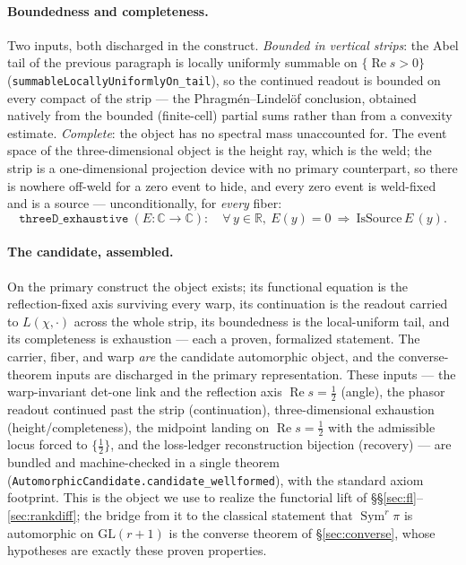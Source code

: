 \documentclass[11pt]{article}
\theoremstyle{definition}
\renewcommand{\Re}{\operatorname{Re}}
\newcommand{\Sym}{\operatorname{Sym}}
\begin{document}
\paragraph{Boundedness and completeness.} Two inputs, both discharged in the construct.
\emph{Bounded in vertical strips}: the Abel tail of the previous paragraph is locally uniformly
summable on $\{\Re s>0\}$ (\texttt{summableLocallyUniformlyOn\_tail}), so the continued readout is
bounded on every compact of the strip --- the Phragm\'en--Lindel\"of conclusion, obtained natively from
the bounded (finite-cell) partial sums rather than from a convexity estimate.
\emph{Complete}: the object has no spectral mass unaccounted for. The event space of the
three-dimensional object is the height ray, which is the weld; the strip is a one-dimensional
projection device with no primary counterpart, so there is nowhere off-weld for a zero event to hide,
and every zero event is weld-fixed and is a source --- unconditionally, for \emph{every} fiber:
\[
  \texttt{threeD\_exhaustive}\ (E:\mathbb C\to\mathbb C):\quad
  \forall\,y\in\mathbb R,\ E(y)=0\ \Rightarrow\ \mathrm{IsSource}\,E\,(y).
\]

\paragraph{The candidate, assembled.} On the primary construct the object exists; its functional
equation is the reflection-fixed axis surviving every warp, its continuation is the readout carried to
$L(\chi,\cdot)$ across the whole strip, its boundedness is the local-uniform tail, and its
completeness is exhaustion --- each a proven, formalized statement. The carrier, fiber, and warp
\emph{are} the candidate automorphic object, and the converse-theorem inputs are discharged in the
primary representation. These inputs --- the warp-invariant det-one link and the reflection axis
$\Re s=\tfrac12$ (angle), the phasor readout continued past the strip (continuation), three-dimensional
exhaustion (height/completeness), the midpoint landing on $\Re s=\tfrac12$ with the admissible locus
forced to $\{\tfrac12\}$, and the loss-ledger reconstruction bijection (recovery) --- are bundled and
machine-checked in a single theorem (\texttt{AutomorphicCandidate.candidate\_wellformed}), with the
standard axiom footprint. This is the object we use to realize the functorial lift of
\S\S\ref{sec:fl}--\ref{sec:rankdiff}; the bridge from it to the classical statement that $\Sym^r\pi$ is
automorphic on $\mathrm{GL}(r+1)$ is the converse theorem of \S\ref{sec:converse}, whose hypotheses are
exactly these proven properties.
\end{document}
